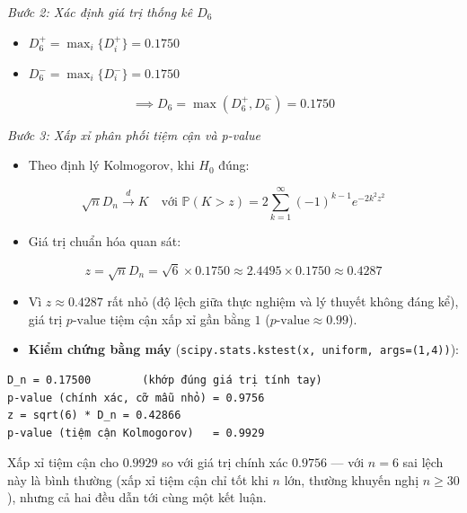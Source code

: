 \documentclass[12pt,a4paper]{article}
\begin{document}
\emph{Bước 2: Xác định giá trị thống kê \(D_6\)}

\begin{itemize}

\item
  \(D_6^+ = \max_i \{D_i^+\} = 0.1750\)
\item
  \(D_6^- = \max_i \{D_i^-\} = 0.1750\)
\end{itemize}

\[\implies D_6 = \max(D_6^+, D_6^-) = 0.1750\]

\emph{Bước 3: Xấp xỉ phân phối tiệm cận và p-value}

\begin{itemize}

\item
  Theo định lý Kolmogorov, khi \(H_0\) đúng:
\end{itemize}

\[\sqrt{n} D_n \xrightarrow{d} K \quad \text{với } \mathbb{P}(K > z) = 2 \sum_{k=1}^{\infty} (-1)^{k-1} e^{-2 k^2 z^2}\]

\begin{itemize}

\item
  Giá trị chuẩn hóa quan sát:
\end{itemize}

\[z = \sqrt{n} D_n = \sqrt{6} \times 0.1750 \approx 2.4495 \times 0.1750 \approx 0.4287\]

\begin{itemize}
\item
  Vì \(z \approx 0.4287\) rất nhỏ (độ lệch giữa thực nghiệm và lý thuyết không đáng kể), giá trị \(p\text{-value}\) tiệm cận xấp xỉ gần bằng \(1\) (\(p\text{-value} \approx 0.99\)).
\item
  \textbf{Kiểm chứng bằng máy} (\texttt{scipy.stats.kstest(x,\ \textquotesingle{}uniform\textquotesingle{},\ args=(1,4))}):
\end{itemize}

\begin{verbatim}
D_n = 0.17500        (khớp đúng giá trị tính tay)
p-value (chính xác, cỡ mẫu nhỏ) = 0.9756
z = sqrt(6) * D_n = 0.42866
p-value (tiệm cận Kolmogorov)   = 0.9929
\end{verbatim}

Xấp xỉ tiệm cận cho \(0.9929\) so với giá trị chính xác \(0.9756\) --- với \(n = 6\) sai lệch này là bình thường (xấp xỉ tiệm cận chỉ tốt khi \(n\) lớn, thường khuyến nghị \(n \ge 30\)), nhưng cả hai đều dẫn tới cùng một kết luận.
\end{document}
